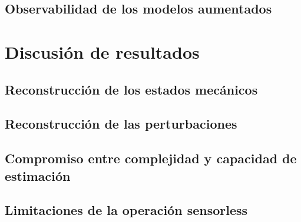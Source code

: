 \subsection{Observabilidad de los modelos aumentados}


\section{Discusión de resultados}

\subsection{Reconstrucción de los estados mecánicos}

\subsection{Reconstrucción de las perturbaciones}

\subsection{Compromiso entre complejidad y capacidad de estimación}

\subsection{Limitaciones de la operación sensorless}